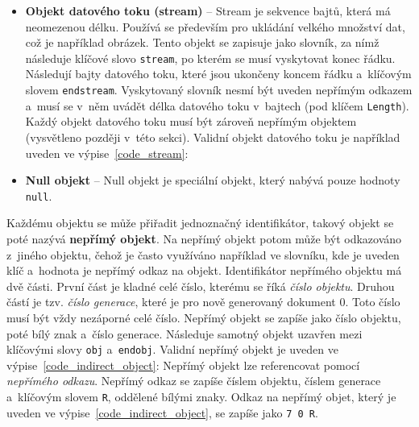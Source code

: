 \begin{itemize}
    \item \textbf{Objekt datového toku (stream)} -- Stream je sekvence bajtů, 
    která má neomezenou délku. Používá se především pro ukládání velkého množství
    dat, což je například obrázek. Tento objekt se zapisuje jako slovník, za nímž
    následuje klíčové slovo \texttt{stream}, po kterém se musí vyskytovat konec
    řádku. Následují bajty datového toku, které jsou ukončeny koncem řádku
    a~klíčovým slovem \texttt{endstream}. Vyskytovaný slovník nesmí být uveden
    nepřímým odkazem a~musí se v~něm uvádět délka datového toku v~bajtech (pod
    klíčem \texttt{Length}). Každý objekt datového toku musí být zároveň nepřímým
    objektem (vysvětleno později v~této sekci). Validní objekt datového toku je
    například uveden ve výpise~\ref{code_stream}:

    \item \textbf{Null objekt} -- Null objekt je speciální objekt, který nabývá
    pouze hodnoty \texttt{null}.
\end{itemize}

Každému objektu se může přiřadit jednoznačný identifikátor, takový objekt se poté
nazývá \textbf{nepřímý objekt}. Na nepřímý objekt potom může být odkazováno
z~jiného objektu, čehož je často využíváno například ve slovníku, kde je uveden
klíč a~hodnota je nepřímý odkaz na objekt. Identifikátor nepřímého objektu má dvě
části. První část je kladné celé číslo, kterému se říká \emph{číslo objektu}.
Druhou částí je tzv. \emph{číslo generace}, které je pro nově generovaný dokument
0. Toto číslo musí být vždy nezáporné celé číslo. Nepřímý objekt se zapíše jako
číslo objektu, poté bílý znak a~číslo generace. Následuje samotný objekt uzavřen
mezi klíčovými slovy \texttt{obj} a~\texttt{endobj}. Validní nepřímý objekt je
uveden ve výpise~\ref{code_indirect_object}:
\noindent Nepřímý objekt lze referencovat pomocí \emph{nepřímého odkazu}.
Nepřímý odkaz se zapíše číslem objektu, číslem generace a~klíčovým slovem
\texttt{R}, oddělené bílými znaky. Odkaz na nepřímý objet, který je uveden ve
výpise~\ref{code_indirect_object}, se zapíše jako \texttt{7 0 R}.


